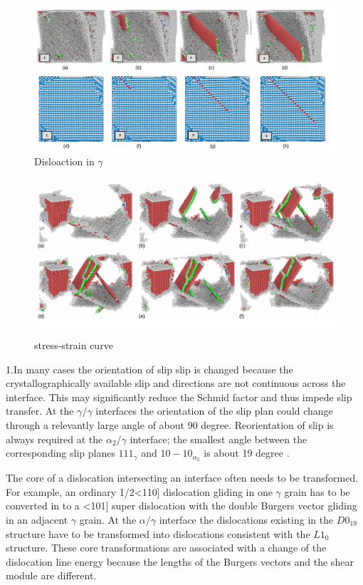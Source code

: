 \documentclass[journal,article,submit,moreauthors,pdftex,10pt,a4paper]{Definitions/mdpi}
\begin{document}
	\begin{figure}[ht]
		\centering
		\includegraphics[width=1\linewidth]{"img/disl-gamma"}
		\caption{Disloaction in $\gamma$}
		\label{fig:dis-alpha}
	\end{figure}

	\begin{figure}[ht]
		\centering
		\includegraphics[width=1\linewidth]{img/disl2-gamma}
		\label{fig:surf}
		\caption{stress-strain curve}
	\end{figure}
1.In many cases the orientation of slip slip is changed because the crystallographically available slip and directions are not continuous across the interface. This may significantly reduce the Schmid factor and thus impede slip transfer. At the $\gamma/\gamma$ interfaces the orientation of the slip plan could change through a relevantly large angle of about 90 degree. Reorientation of slip is always required at the $\alpha_{2}/\gamma$ interface; the smallest angle between the corresponding slip planes ${1 1 1 }_{\gamma}$ and ${ 1 0 -1 0}_{\alpha_2}$ is about 19 degree \cite{}.
	
The core of  a dislocation intersecting an interface often needs to be transformed. For example, an ordinary 1/2<110] dislocation gliding in one $\gamma$ grain has to be converted in to a <101] super dislocation with the double Burgers vector gliding in an adjacent $\gamma$ grain. At the $\alpha/\gamma$ interface the dislocations existing in the $D0_{19}$ structure have to be transformed into dislocations consistent with the $L1_0$structure. These core transformations are associated with a change of the dislocation line energy because the lengths of the Burgers vectors and the shear module are different.
	
\end{document}
